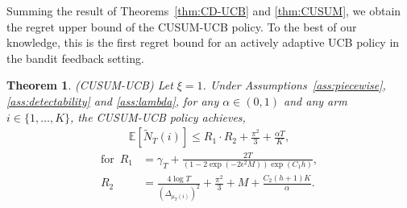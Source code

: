\documentclass[letterpaper]{article} %
\newtheorem{theorem}{Theorem}
\begin{document}
Summing the result of Theorems~\ref{thm:CD-UCB} and \ref{thm:CUSUM}, we obtain the regret upper bound of the CUSUM-UCB policy. To the best of our knowledge, this is the first regret bound for an actively adaptive UCB policy in the bandit feedback setting.
\begin{theorem}\label{thm:CUSUM-UCB}
\emph{(CUSUM-UCB)} Let $\xi=1$.  Under 
Assumptions~\ref{ass:piecewise}, \ref{ass:detectability} and
\ref{ass:lambda}, for any $\alpha\in(0,1)$ and any arm
$i\in\{1,\ldots,K\}$, the CUSUM-UCB policy achieves,
\begin{align}
\mathbb{E}[\tilde{N}_T(i)]\leq R_1\cdot
  R_2+\frac{\pi^2}{3}+\frac{\alpha T}{K},
\end{align}
\vspace{-0.2cm}
\begin{align*}
\text{for} \,\,\, R_1&=\gamma_T+\frac{2 T}{(1-2\exp(-2\epsilon^2M))\exp(C_1h)},\\
R_2&=\frac{4\log T}{(\Delta_{\mu_T(i)})^2}+\frac{\pi^2}{3}+M+\frac{C_2(h+1)K}{\alpha}.
\end{align*}
\end{theorem}
\end{document}
